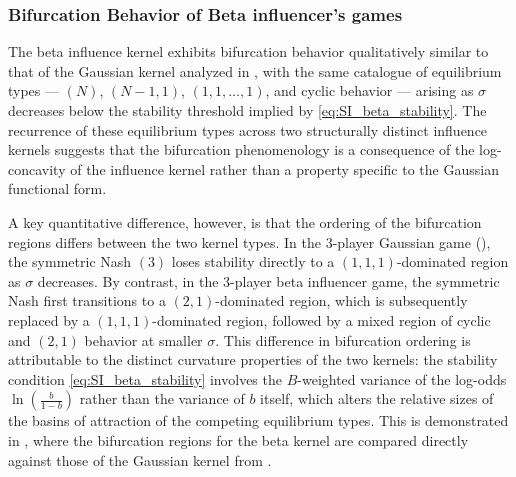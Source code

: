 \documentclass{article}
\begin{document}
            \subsubsection{Bifurcation Behavior of Beta influencer's games}\label{subsubsec:SI_beta_bifurcation}
            The beta influence kernel exhibits bifurcation behavior qualitatively similar to that of the Gaussian kernel analyzed in , with the same catalogue of equilibrium types --- $(N)$, $(N-1,1)$, $(1,1,\ldots,1)$, and cyclic behavior --- arising as $\sigma$ decreases below the stability threshold implied by \cref{eq:SI_beta_stability}. The recurrence of these equilibrium types across two structurally distinct influence kernels suggests that the bifurcation phenomenology is a consequence of the log-concavity of the influence kernel rather than a property specific to the Gaussian functional form.

            A key quantitative difference, however, is that the ordering of the bifurcation regions differs between the two kernel types. In the 3-player Gaussian game (), the symmetric Nash $(3)$ loses stability directly to a $(1,1,1)$-dominated region as $\sigma$ decreases. By contrast, in the 3-player beta influencer game, the symmetric Nash first transitions to a $(2,1)$-dominated region, which is subsequently replaced by a $(1,1,1)$-dominated region, followed by a mixed region of cyclic and $(2,1)$ behavior at smaller $\sigma$. This difference in bifurcation ordering is attributable to the distinct curvature properties of the two kernels: the stability condition \cref{eq:SI_beta_stability} involves the $B$-weighted variance of the log-odds $\ln\!\left(\frac{b}{1-b}\right)$ rather than the variance of $b$ itself, which alters the relative sizes of the basins of attraction of the competing equilibrium types. This is demonstrated in , where the bifurcation regions for the beta kernel are compared directly against those of the Gaussian kernel from .
\end{document}
